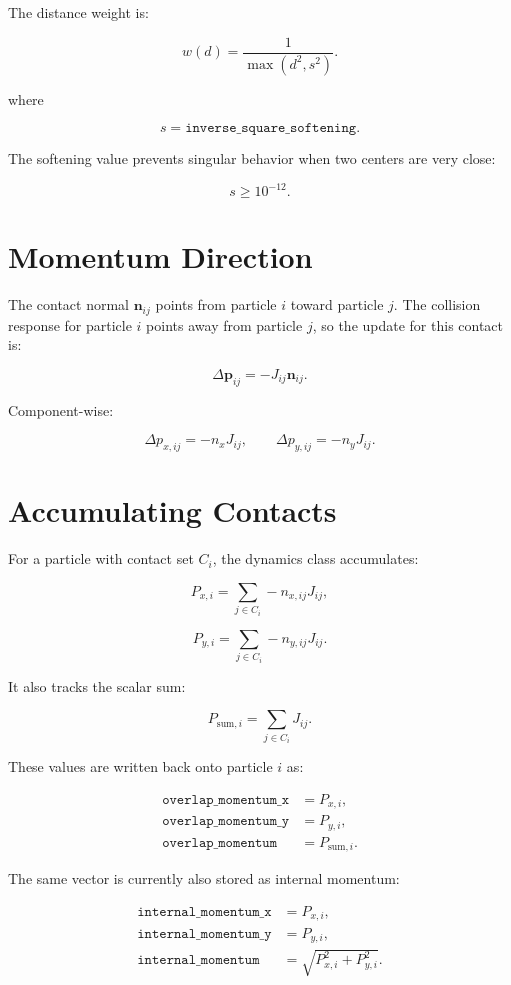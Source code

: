 \documentclass[11pt]{article}
\begin{document}
The distance weight is:

\[
    w(d)
    =
    \frac{1}{\max(d^2,s^2)}.
\]

where

\[
    s = \texttt{inverse\_square\_softening}.
\]

The softening value prevents singular behavior when two centers are very close:

\[
    s \ge 10^{-12}.
\]

\section{Momentum Direction}

The contact normal \(\mathbf{n}_{ij}\) points from particle \(i\) toward
particle \(j\). The collision response for particle \(i\) points away from
particle \(j\), so the update for this contact is:

\[
    \Delta \mathbf{p}_{ij}
    =
    -J_{ij}\mathbf{n}_{ij}.
\]

Component-wise:

\[
    \Delta p_{x,ij} = -n_x J_{ij},
    \qquad
    \Delta p_{y,ij} = -n_y J_{ij}.
\]

\section{Accumulating Contacts}

For a particle with contact set \(C_i\), the dynamics class accumulates:

\[
    P_{x,i}
    =
    \sum_{j\in C_i}
    -n_{x,ij}J_{ij},
\]

\[
    P_{y,i}
    =
    \sum_{j\in C_i}
    -n_{y,ij}J_{ij}.
\]

It also tracks the scalar sum:

\[
    P_{\text{sum},i}
    =
    \sum_{j\in C_i}
    J_{ij}.
\]

These values are written back onto particle \(i\) as:

\[
\begin{aligned}
    \texttt{overlap\_momentum\_x} &= P_{x,i},\\
    \texttt{overlap\_momentum\_y} &= P_{y,i},\\
    \texttt{overlap\_momentum} &= P_{\text{sum},i}.
\end{aligned}
\]

The same vector is currently also stored as internal momentum:

\[
\begin{aligned}
    \texttt{internal\_momentum\_x} &= P_{x,i},\\
    \texttt{internal\_momentum\_y} &= P_{y,i},\\
    \texttt{internal\_momentum} &=
    \sqrt{P_{x,i}^2+P_{y,i}^2}.
\end{aligned}
\]
\end{document}
